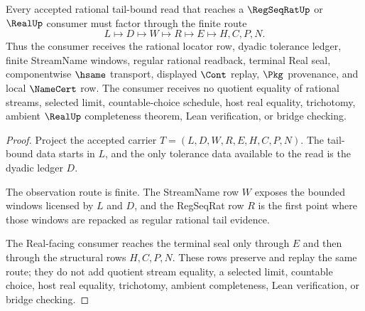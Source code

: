 \begin{theorem}
\label{thm:rational-cauchy-tail-bound-regular-real-handoff}
Every accepted rational tail-bound read that reaches a $\RegSeqRatUp$ or $\RealUp$ consumer must factor through the finite route
$$
L \longmapsto D \longmapsto W \longmapsto R \longmapsto E \longmapsto H,C,P,N .
$$
Thus the consumer receives the rational locator row, dyadic tolerance ledger, finite StreamName windows, regular rational readback, terminal Real seal, componentwise $\hsame$ transport, displayed $\Cont$ replay, $\Pkg$ provenance, and local $\NameCert$ row. The consumer receives no quotient equality of rational streams, selected limit, countable-choice schedule, host real equality, trichotomy, ambient $\RealUp$ completeness theorem, Lean verification, or bridge checking.
\end{theorem}
\begin{proof}
Project the accepted carrier $T=(L,D,W,R,E,H,C,P,N)$. The tail-bound data starts in $L$, and the only tolerance data available to the read is the dyadic ledger $D$.

The observation route is finite. The StreamName row $W$ exposes the bounded windows licensed by $L$ and $D$, and the RegSeqRat row $R$ is the first point where those windows are repacked as regular rational tail evidence.

The Real-facing consumer reaches the terminal seal only through $E$ and then through the structural rows $H,C,P,N$. These rows preserve and replay the same route; they do not add quotient stream equality, a selected limit, countable choice, host real equality, trichotomy, ambient completeness, Lean verification, or bridge checking.
\end{proof}



